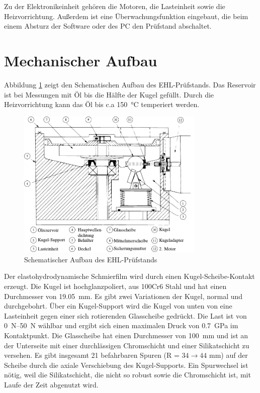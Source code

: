 Zu der Elektronikeinheit gehören die Motoren, die Lasteinheit sowie die Heizvorrichtung.
Außerdem ist eine Überwachungsfunktion eingebaut, die beim einem Absturz der Software oder des PC den Prüfstand abschaltet.

\section{Mechanischer Aufbau}
\label{sec:mechanischer_aufbau}

Abbildung \ref{fig:ehl_aufbau} zeigt den Schematischen Aufbau des EHL-Prüfstands.
Das Reservoir ist bei Messungen mit Öl bis die Hälfte der Kugel gefüllt.
Durch die Heizvorrichtung kann das Öl bis c.a \SI{150}{\degreeCelsius} temperiert werden.
\begin{figure}[htb]
    \centering
    \includegraphics[width=0.8\textwidth]{./images/ehd_pruefstand_aufbau.pdf}
    \caption{Schematischer Aufbau des EHL-Prüfstands \cite{ehl}}
    \label{fig:ehl_aufbau}
\end{figure}
%
Der elastohydrodynamische Schmierfilm wird durch einen Kugel-Scheibe-Kontakt erzeugt.
Die Kugel ist hochglanzpoliert, aus 100Cr6 Stahl und hat einen Durchmesser von \SI{19.05}{\milli\meter}.
Es gibt zwei Variationen der Kugel, normal und durchgebohrt.
Über ein Kugel-Support wird die Kugel von unten von eine Lasteinheit gegen einer sich rotierenden Glasscheibe gedrückt.
Die Last ist von \SIrange{0}{50}{\newton} wählbar und ergibt sich einen maximalen Druck von \SI{0.7}{\giga\pascal} im Kontaktpunkt.
Die Glasscheibe hat einen Durchmesser von \SI{100}{\milli\meter} und ist an der Unterseite mit einer durchlässigen Chromschicht und einer Silikatschicht zu versehen.
Es gibt insgesamt \num{21} befahrbaren Spuren (R = $34 \rightarrow 44$ \si{\milli\meter}) auf der Scheibe durch die axiale Verschiebung des Kugel-Supports.
Ein Spurwechsel ist nötig, weil die Silikatschicht, die nicht so robust sowie die Chromschicht ist, mit Laufe der Zeit abgenutzt wird.

